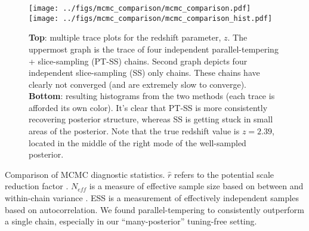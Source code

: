 \documentclass{article} %
\begin{document}
\begin{figure}
\texttt{[image: ../figs/mcmc\_comparison/mcmc\_comparison.pdf]}
\texttt{[image: ../figs/mcmc\_comparison/mcmc\_comparison\_hist.pdf]}
\caption{\textbf{Top}: multiple trace plots for the redshift parameter, $z$.  The uppermost graph is the trace of four independent parallel-tempering + slice-sampling (PT-SS) chains.  Second graph depicts four independent slice-sampling (SS) only chains.  These chains have clearly not converged (and are extremely slow to converge). \textbf{Bottom}: resulting histograms from the two methods (each trace is afforded its own color).  It's clear that PT-SS is more consistently recovering posterior structure, whereas SS is getting stuck in small areas of the posterior. Note that the true redshift value is $z=2.39$, located in the middle of the right mode of the well-sampled posterior. }
\label{fig:mcmc_comparison}
\end{figure}

\begin{table}
	
\caption{Comparison of MCMC diagnostic statistics.  $\hat r$ refers to the potential scale reduction factor \cite{gelman2011inference}.  $N_{eff}$ is a measure of effective sample size based on between and within-chain variance \cite{gelman2014bayesian}.  ESS is a measurement of effectively independent samples based on autocorrelation.  We found parallel-tempering to consistently outperform a single chain, especially in our ``many-posterior'' tuning-free setting.}
\label{fig:mcmc_table}
\end{table}

\clearpage



\end{document}
